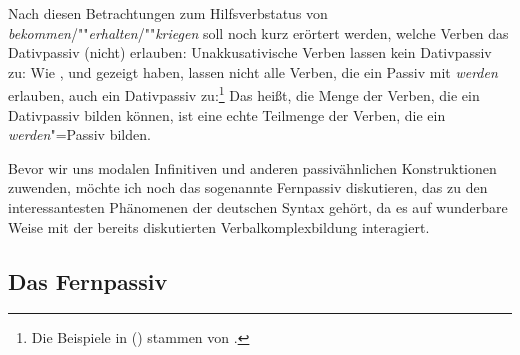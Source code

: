 Nach diesen Betrachtungen zum Hilfsverbstatus von \emph{bekommen}/""\emph{erhalten}/""\emph{kriegen}
soll noch kurz erörtert werden, welche Verben das Dativpassiv (nicht) erlauben:
Unakkusativische Verben lassen kein Dativpassiv zu:
\eal
\label{bsp-kriegen-erg}
\zl
Wie \citet*[]{Reis76a}, \citet*[]{Askedal84} und 
\citet{Leirbukt87} gezeigt haben, lassen nicht alle Verben,
die ein Passiv mit \emph{werden} erlauben, auch ein Dativpassiv zu:\footnote{
        Die Beispiele in () stammen von \citet*[]{Askedal84}.%
}
\eal
{}
\zl
Das heißt, die Menge der Verben, die ein Dativpassiv bilden können,
ist eine echte Teilmenge der Verben, die ein \emph{werden}"=Passiv bilden.

Bevor wir uns modalen Infinitiven und anderen passivähnlichen Konstruktionen
zuwenden, möchte ich noch das sogenannte Fernpassiv diskutieren,
das zu den interessantesten Phänomenen der deutschen Syntax gehört,
da es auf wunderbare Weise mit der bereits diskutierten Verbalkomplexbildung
interagiert.

\subsection{Das Fernpassiv}
\label{sec-remote-passive-phen}

